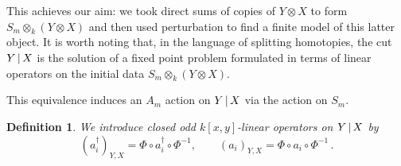 \documentclass[english,letter paper,12pt,leqno]{article}
\theoremstyle{example}
\newtheorem{definition}[theorem]{Definition}
\numberwithin{equation}{section}
\begin{document}
This achieves our aim: we took direct sums of copies of $Y \otimes X$ to form $S_m \otimes_k( Y \otimes X )$ and then used perturbation to find a finite model of this latter object. It is worth noting that, in the language of splitting homotopies, the cut $Y \,|\, X$ is the solution of a fixed point problem formulated in terms of linear operators on the initial data $S_m \otimes_k( Y \otimes X )$. 

This equivalence induces an $A_m$ action on $Y \,|\, X$ via the action on $S_m$.

\begin{definition} We introduce closed odd $k[x,y]$-linear operators on $Y \,|\, X$ by
\begin{equation}\label{eq:new_operators}
(a_i^\dagger)_{Y,X} = \Phi \circ a_i^\dagger \circ \Phi^{-1}, \qquad (a_i)_{Y,X} = \Phi \circ a_i \circ \Phi^{-1}\,.
\end{equation}
\end{definition}
\end{document}
